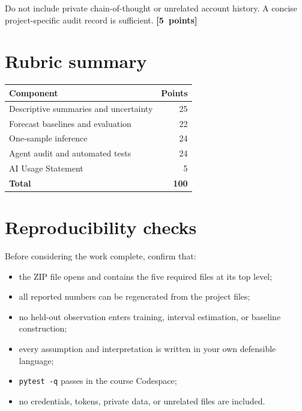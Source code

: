\documentclass[11pt]{article}
\newcommand{\points}[1]{\nobreak\hfill\mbox{\textcolor{GTBlue}{\textbf{[#1 points]}}}}
\begin{document}
Do not include private chain-of-thought or unrelated account history. A concise project-specific audit record is sufficient. \points{5}

\section*{Rubric summary}

\begin{center}
\begin{tabular}{lr}
\toprule
\textbf{Component} & \textbf{Points} \\
\midrule
Descriptive summaries and uncertainty & 25 \\
Forecast baselines and evaluation & 22 \\
One-sample inference & 24 \\
Agent audit and automated tests & 24 \\
AI Usage Statement & 5 \\
\midrule
\textbf{Total} & \textbf{100} \\
\bottomrule
\end{tabular}
\end{center}

\section*{Reproducibility checks}

Before considering the work complete, confirm that:
\begin{itemize}
  \item the ZIP file opens and contains the five required files at its top level;
  \item all reported numbers can be regenerated from the project files;
  \item no held-out observation enters training, interval estimation, or baseline construction;
  \item every assumption and interpretation is written in your own defensible language;
  \item \texttt{pytest -q} passes in the course Codespace;
  \item no credentials, tokens, private data, or unrelated files are included.
\end{itemize}
\end{document}
